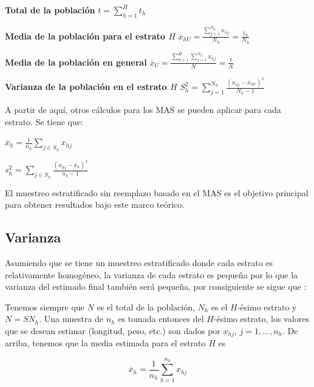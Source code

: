 \bigbreak

\textbf{Total de la población}
\bigbreak
$t = \sum \limits_{h=1}^H t_h$


\bigbreak

\textbf{Media de la población para el estrato $H$}
\bigbreak
$\overline{x}_{hU} = \frac{\sum \limits_{j=1}^{N_h} x_{hj}}{N_h} = \frac{t_h}{N_h}$


\bigbreak

\textbf{Media de la población en general}
\bigbreak
$\overline{x}_U = \frac{\sum \limits_{h=1}^H \sum \limits_{j=1}^{N_h} x_{hj}}{N} = \frac{t}{N}$


\bigbreak

\textbf{Varianza de la población en el estrato $H$}
\bigbreak
$S_h^2 = \sum \limits_{j=1}^{N_h} \frac{(x_{hj} - \overline{x}_{hU})^2}{N_h - 1}$


\bigbreak

A partir de aquí, otros cálculos para los MAS se pueden aplicar para cada estrato. Se tiene que:

\bigbreak

$\overline{x}_h = \frac{1}{n_h} \sum \limits_{j \in S_h} x_{hj}$

\bigbreak

$s^2_h = \sum \limits_{j \in S_h} \frac{(x_{hj} - \overline{x}_h)^2}{n_h - 1}$

\bigbreak

El muestreo estratificado sin reemplazo basado en el MAS es el objetivo principal para obtener resultados bajo este marco teórico.

\subsection{Varianza}

Asumiendo que se tiene un muestreo estratificado donde cada estrato es relativamente homogéneo, la varianza de cada estrato es pequeña por lo que la varianza del estimado final también será pequeña, por consiguiente se sigue que \cite{gulland-1966}:

\bigbreak

Tenemos siempre que $N$ es el total de la población, $N_h$ es el $H$-ésimo estrato y $N=SN_h$. Una muestra de $n_h$ es tomada entonces del $H$-ésimo estrato, los valores que se desean estimar (longitud, peso, etc.) son dados por $x_{hj}$, $j=1,...,n_h$. De arriba, tenemos que la media estimada para el estrato $H$ es

$$
\overline{x}_h = \frac{1}{n_h} \sum \limits_{h=1}^{n_h} x_{hj}
$$

